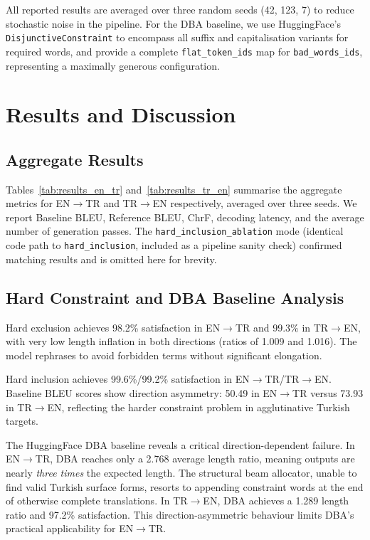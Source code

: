 \documentclass{CUP-JNL-NLP}
\begin{document}
All reported results are averaged over three random seeds (42, 123, 7) to reduce
stochastic noise in the pipeline. For the DBA baseline, we use HuggingFace's
\texttt{DisjunctiveConstraint} to encompass all suffix and capitalisation variants
for required words, and provide a complete \texttt{flat\_token\_ids} map for
\texttt{bad\_words\_ids}, representing a maximally generous configuration.

\section{Results and Discussion}

\subsection{Aggregate Results}

Tables~\ref{tab:results_en_tr} and~\ref{tab:results_tr_en} summarise the aggregate
metrics for EN$\rightarrow$TR and TR$\rightarrow$EN respectively, averaged over three
seeds. We report Baseline BLEU, Reference BLEU, ChrF, decoding latency, and the
average number of generation passes. The \texttt{hard\_inclusion\_ablation} mode
(identical code path to \texttt{hard\_inclusion}, included as a pipeline sanity
check) confirmed matching results and is omitted here for brevity.

\subsection{Hard Constraint and DBA Baseline Analysis}

Hard exclusion achieves 98.2\% satisfaction in EN$\rightarrow$TR and 99.3\% in
TR$\rightarrow$EN, with very low length inflation in both directions (ratios of 1.009
and 1.016). The model rephrases to avoid forbidden terms without significant
elongation.

Hard inclusion achieves 99.6\%/99.2\% satisfaction in
EN$\rightarrow$TR/TR$\rightarrow$EN. Baseline BLEU scores show direction asymmetry:
50.49 in EN$\rightarrow$TR versus 73.93 in TR$\rightarrow$EN, reflecting the harder
constraint problem in agglutinative Turkish targets.

The HuggingFace DBA baseline reveals a critical direction-dependent failure. In
EN$\rightarrow$TR, DBA reaches only a 2.768 average length ratio, meaning outputs
are nearly \emph{three times} the expected length. The structural beam allocator,
unable to find valid Turkish surface forms, resorts to appending constraint words at
the end of otherwise complete translations. In TR$\rightarrow$EN, DBA achieves a
1.289 length ratio and 97.2\% satisfaction. This direction-asymmetric behaviour
limits DBA's practical applicability for EN$\rightarrow$TR.
\end{document}
